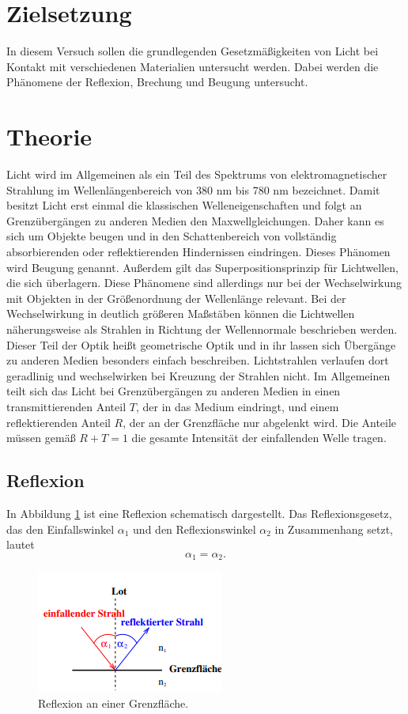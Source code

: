 \section{Zielsetzung}
\noindent In diesem Versuch sollen die grundlegenden Gesetzmäßigkeiten von Licht bei Kontakt mit verschiedenen
Materialien untersucht werden. Dabei werden die Phänomene der Reflexion, Brechung und Beugung untersucht.
\section{Theorie}
\label{sec:Theorie}
\noindent Licht wird im Allgemeinen als ein Teil des Spektrums von elektromagnetischer Strahlung im Wellenlängenbereich
von 380 nm bis 780 nm bezeichnet. Damit besitzt Licht erst einmal die klassischen Welleneigenschaften und folgt an Grenzübergängen
zu anderen Medien den Maxwellgleichungen. Daher kann es sich um Objekte
beugen und in den Schattenbereich von vollständig absorbierenden oder reflektierenden Hindernissen eindringen. Dieses Phänomen wird Beugung
genannt. Außerdem gilt das Superpositionsprinzip für Lichtwellen, die sich überlagern. Diese Phänomene sind allerdings nur bei
der Wechselwirkung mit Objekten in der Größenordnung der Wellenlänge relevant. Bei der Wechselwirkung in deutlich größeren Maßstäben
können die Lichtwellen näherungsweise als Strahlen in Richtung der Wellennormale beschrieben werden. Dieser Teil der Optik heißt geometrische Optik
und in ihr lassen sich Übergänge zu anderen Medien besonders einfach beschreiben. Lichtstrahlen verlaufen dort geradlinig und wechselwirken bei Kreuzung der Strahlen nicht.
Im Allgemeinen teilt sich das Licht bei 
Grenzübergängen zu anderen Medien in einen transmittierenden Anteil $T$, der in das Medium eindringt, und einem reflektierenden
Anteil $R$, der an der Grenzfläche nur abgelenkt wird. Die Anteile müssen gemäß $R+T=1$ die gesamte Intensität der einfallenden Welle 
tragen.
\subsection{Reflexion}
In Abbildung \ref{fig:Ref} ist eine Reflexion schematisch dargestellt.
Das Reflexionsgesetz, das den Einfallswinkel $\alpha_1$ und den Reflexionswinkel $\alpha_2$ in Zusammenhang
setzt, lautet
\begin{equation}
    \alpha_1=\alpha_2.
    \label{eq:Reflexion}
\end{equation}
\begin{figure}[H]
    \centering
    \includegraphics{content/Reflexion.png}
    \caption{Reflexion an einer Grenzfläche\cite{V400}.}
    \label{fig:Ref}
\end{figure}
